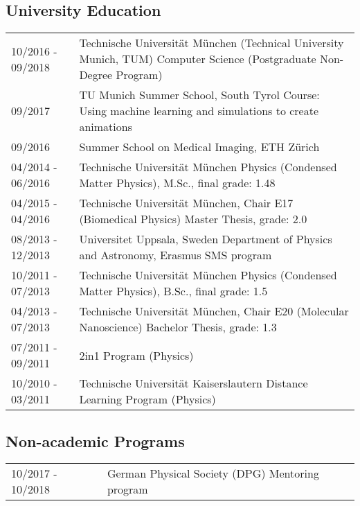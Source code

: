 \documentclass[a4paper,10pt]{memoir}
\begin{document}
\subsection*{University Education}
\vspace*{-\baselineskip}
\begin{longtable}{@{}p{} p{}}
  10/2016 - 09/2018 &
  Technische Universität München (Technical University Munich, TUM) \newline
  Computer Science (Postgraduate Non-Degree Program)
  \\
  09/2017 &
  TU Munich Summer School, South Tyrol \newline
  Course: Using machine learning and simulations to create animations
  \\
  09/2016 &
  Summer School on Medical Imaging, ETH Zürich 
  \\
  04/2014 - 06/2016 &
  Technische Universität München \newline 
  Physics (Condensed Matter Physics), M.Sc., final grade: 1.48
  \\
  04/2015 - 04/2016 &
  Technische Universität München, Chair E17 (Biomedical Physics) \newline 
  Master Thesis, grade: 2.0
  \\
  08/2013 - 12/2013 &
  Universitet Uppsala, Sweden \newline 
  Department of Physics and Astronomy, Erasmus SMS program 
  \\
  10/2011 - 07/2013 &
  Technische Universität München \newline 
  Physics (Condensed Matter Physics), B.Sc., final grade: 1.5 
  \\
  04/2013 - 07/2013 &
  Technische Universität München, Chair E20 (Molecular Nanoscience) \newline 
  Bachelor Thesis, grade: 1.3
  \\
  07/2011 - 09/2011 &
  2in1 Program (Physics)
  \\
  10/2010 - 03/2011 &
  Technische Universität Kaiserslautern \newline 
  Distance Learning Program (Physics)
\end{longtable}

\subsection*{Non-academic Programs}
\vspace*{-\baselineskip}
\begin{longtable}{@{}p{} p{}}
  10/2017 - 10/2018 &
  German Physical Society (DPG) \newline
  Mentoring program
\end{longtable}
\end{document}
